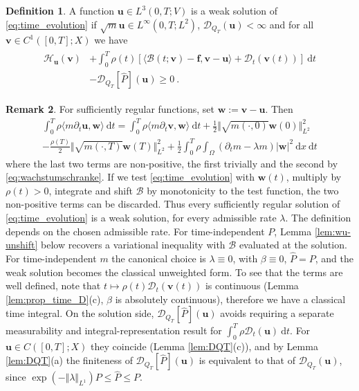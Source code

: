 \documentclass{article}
\theoremstyle{definition}
\newtheorem{definition}{Definition}[section]
\newtheorem{remark}[definition]{Remark}
\newcommand{\bfu}{\boldsymbol{u}}
\newcommand{\bfv}{\boldsymbol{v}}
\newcommand{\bfw}{\boldsymbol{w}}
\newcommand{\bff}{\boldsymbol{f}}
\newcommand{\D}{\mathcal{D}}
\newcommand{\dd}{\:\mathrm{d}}
\newcommand{\B}{\mathcal{B}}
\newcommand{\Hh}{\mathcal{H}}
\begin{document}
\begin{definition}\label{def:solution_evolution}
    A function $\bfu \in L^3(0,T;V)$ is a weak solution of \eqref{eq:time_evolution} if
    $\sqrt{m}\bfu \in L^\infty(0,T;L^2)$, $\D_{Q_T}(\bfu)<\infty$ and
    for all $\bfv \in C^1([0,T];X)$ we have
\begin{align}
    \begin{split}\label{eq:weak_solution}
        \Hh_{\bfu}(\bfv)&+\int_0^T\rho(t)
        \left[\langle\B(t;\bfv)-\bff,\bfv-\bfu\rangle
        +\D_t(\bfv(t))\right]\dd t\\
        &-\D_{Q_T}[\hat P](\bfu)\geq0\ .
    \end{split}\end{align}

\end{definition}

\begin{remark}
For sufficiently regular functions, set $\bfw:=\bfv-\bfu$. Then
\begin{align*}
    \int_{0}^{T}\rho \langle m \partial_t \bfu,\bfw\rangle \dd t
    = \int_{0}^{T} \rho \langle m \partial_t \bfv , \bfw\rangle \dd t +
    \frac 1 2 \Vert \sqrt{m(\cdot,0)} \bfw(0)\Vert_{L^{2}}^2 \\
    -\frac{\rho(T)}{2} \Vert \sqrt{m(\cdot, T)} \bfw (T)\Vert^{2}_{L^2}
    + \frac 1 2 \int_0^T \rho\int_\Omega (\partial_t m-\lambda m)|\bfw|^2 \dd x \dd t
\end{align*}
where the last two terms are non-positive, the first trivially and the second by \eqref{eq:wachstumschranke}.
If we test \eqref{eq:time_evolution} with $\bfw(t)$, multiply by $\rho(t)>0$, integrate and
shift $\B$ by monotonicity to the test function, the two non-positive terms can be discarded.
Thus every sufficiently regular solution of \eqref{eq:time_evolution} is a weak solution, for every
admissible rate $\lambda$. The definition depends on the chosen admissible rate.
For time-independent $P$, Lemma \ref{lem:wu-unshift} below recovers a
variational inequality with $\B$ evaluated at the solution. For time-independent $m$
the canonical choice is $\lambda \equiv 0$, with $\beta \equiv 0$, $\hat P =P$, and the weak solution
becomes the classical unweighted form. To see that the terms are well defined, note that $t\mapsto \rho(t)\D_t(\bfv(t))$
is continuous (Lemma \ref{lem:prop_time_D}(c), $\beta$ is absolutely continuous), therefore we have a classical time integral.
On the solution side, $\D_{Q_T}[\hat P](\bfu)$ avoids requiring a separate
measurability and integral-representation result for
$\int_0^T\rho\D_t(\bfu)\dd t$.
For $\bfu\in C([0,T];X)$ they coincide (Lemma \ref{lem:DQT}(c)), and by Lemma \ref{lem:DQT}(a) the
finiteness of $\D_{Q_T}[\hat P](\bfu)$ is equivalent to that of $\D_{Q_T}(\bfu)$, since $\exp(-\Vert\lambda\Vert_{L^1})P\leq \hat P\leq P$.
\end{remark}
\end{document}
